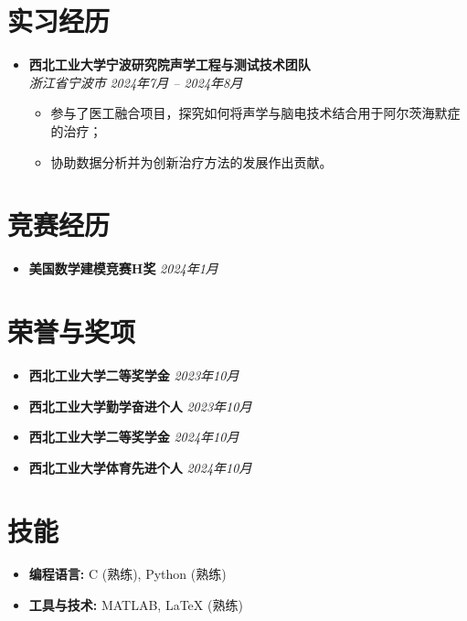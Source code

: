 \documentclass[a4paper,10pt]{article}
\begin{document}
\section*{实习经历}
\begin{itemize}[leftmargin=0.5cm]
	\item \textbf{西北工业大学宁波研究院声学工程与测试技术团队} \\ 
	\textit{浙江省宁波市} \hfill \textit{2024年7月 -- 2024年8月} 
	
	\begin{itemize}
		\item 参与了医工融合项目，探究如何将声学与脑电技术结合用于阿尔茨海默症的治疗；
		\item 协助数据分析并为创新治疗方法的发展作出贡献。
	\end{itemize}
\end{itemize}

\section*{竞赛经历}
\begin{itemize}[leftmargin=0.5cm]
    \item \textbf{美国数学建模竞赛H奖} \hfill \textit{2024年1月}
\end{itemize}

\section*{荣誉与奖项}
\begin{itemize}[leftmargin=0.5cm]
    \item \textbf{西北工业大学二等奖学金} \hfill \textit{2023年10月} 
    \item \textbf{西北工业大学勤学奋进个人} \hfill \textit{2023年10月} 
    \item \textbf{西北工业大学二等奖学金} \hfill \textit{2024年10月}
    \item \textbf{西北工业大学体育先进个人} \hfill \textit{2024年10月}
\end{itemize}

\section*{技能}
\begin{itemize}[leftmargin=0.5cm]
    \item \textbf{编程语言:} C (熟练), Python (熟练)
    \item \textbf{工具与技术:} MATLAB, LaTeX (熟练)
\end{itemize}
\end{document}
